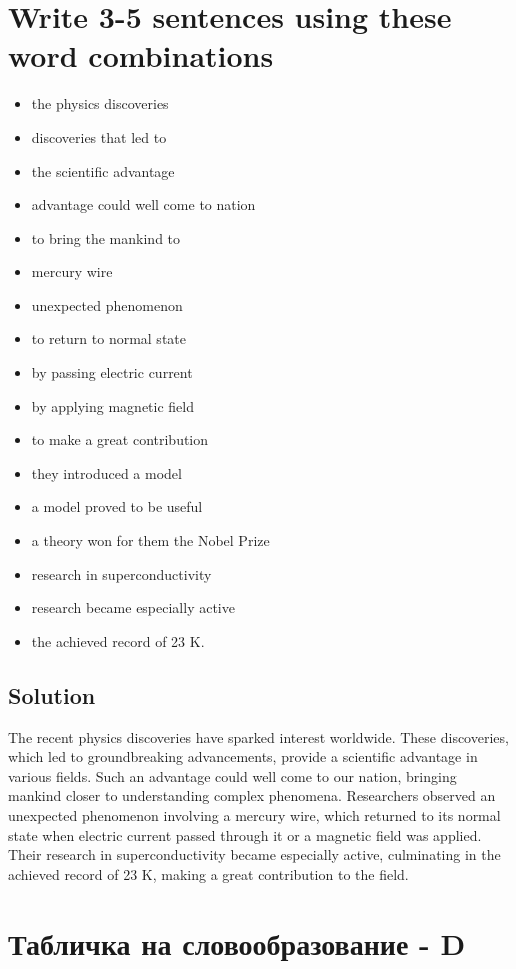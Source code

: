 \section{Write 3-5 sentences using these word combinations}
\begin{itemize}
      \item the physics discoveries
      \item discoveries that led to
      \item the scientific advantage
      \item advantage could well come to nation
      \item to bring the mankind to
      \item mercury wire
      \item unexpected phenomenon
      \item to return to normal state
      \item by passing electric current
      \item by applying magnetic field
      \item to make a great contribution
      \item they introduced a model
      \item a model proved to be useful
      \item a theory won for them the Nobel Prize
      \item research in superconductivity
      \item research became especially active
      \item the achieved record of 23 K.
\end{itemize}

\subsection*{Solution}
The recent physics discoveries have sparked interest worldwide. These discoveries, which led to groundbreaking advancements, provide a scientific advantage in various fields. Such an advantage could well come to our nation, bringing mankind closer to understanding complex phenomena. Researchers observed an unexpected phenomenon involving a mercury wire, which returned to its normal state when electric current passed through it or a magnetic field was applied. Their research in superconductivity became especially active, culminating in the achieved record of 23 K, making a great contribution to the field.

\section{Табличка на словообразование - D}
